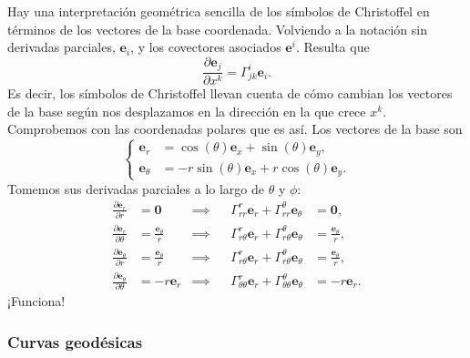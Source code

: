 \begin{observation}
    Hay una interpretación geométrica sencilla de los símbolos de Christoffel en términos de los vectores de la base coordenada. Volviendo a la notación sin derivadas parciales, \(\mathbf{e}_i\), y los covectores asociados \(\mathbf{e}^i\). Resulta que 
    \begin{equation}
        \label{eq.4-christoffel_euclideo}
        \frac{\partial \mathbf{e}_j}{\partial x^k} = \Gamma^{i}_{jk}\mathbf{e}_i.
    \end{equation}
    Es decir, los símbolos de Christoffel llevan cuenta de cómo cambian los vectores de la base según nos desplazamos en la dirección en la que crece \(x^k\). Comprobemos con las coordenadas polares que es así. Los vectores de la base son
    \begin{equation}
        \left\{
        \begin{aligned}        
            \mathbf{e}_r &= \cos(\theta)\mathbf{e}_x + \sin(\theta)\mathbf{e}_y,\\
            \mathbf{e}_\theta &= -r\sin(\theta)\mathbf{e}_x + r\cos(\theta)\mathbf{e}_y.
        \end{aligned}
        \right.
    \end{equation}
    Tomemos sus derivadas parciales a lo largo de \(\theta\) y \(\phi\):
    \begin{align*}
        \frac{\partial \mathbf{e}_r}{\partial r} &= \mathbf{0} &\implies&& \Gamma^{r}_{rr}\mathbf{e}_r + \Gamma^{\theta}_{rr}\mathbf{e}_\theta &= \mathbf{0},\\
        \frac{\partial \mathbf{e}_r}{\partial \theta} &= \frac{\mathbf{e}_\theta}{r} &\implies&& \Gamma^{r}_{r\theta}\mathbf{e}_r + \Gamma^{\theta}_{r\theta}\mathbf{e}_\theta &= \frac{\mathbf{e}_\theta}{r},\\
        \frac{\partial \mathbf{e}_\theta}{\partial r} &= \frac{\mathbf{e}_\theta}{r} &\implies&& \Gamma^{r}_{r\theta}\mathbf{e}_r + \Gamma^{\theta}_{r\theta}\mathbf{e}_\theta &= \frac{\mathbf{e}_\theta}{r},\\
        \frac{\partial \mathbf{e}_\theta}{\partial \theta} &= -r\mathbf{e}_r &\implies&& \Gamma^{r}_{\theta\theta}\mathbf{e}_r + \Gamma^{\theta}_{\theta\theta}\mathbf{e}_\theta &= -r\mathbf{e}_r.
    \end{align*}
    ¡Funciona!
\end{observation}

\subsubsection{Curvas geodésicas}
\label{subsubsec.4geodesicas}


